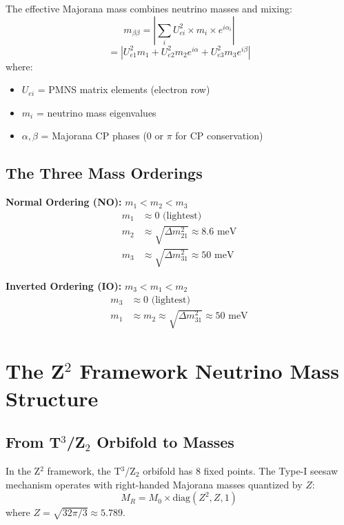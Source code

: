 \documentclass[12pt,a4paper]{article}
\begin{document}
The effective Majorana mass combines neutrino masses and mixing:
\begin{equation}
m_{\beta\beta} = \left| \sum_i U_{ei}^2 \times m_i \times e^{i\alpha_i} \right|
\end{equation}
\begin{equation}
= \left| U_{e1}^2 m_1 + U_{e2}^2 m_2 e^{i\alpha} + U_{e3}^2 m_3 e^{i\beta} \right|
\end{equation}
where:
\begin{itemize}
\item $U_{ei}$ = PMNS matrix elements (electron row)
\item $m_i$ = neutrino mass eigenvalues
\item $\alpha, \beta$ = Majorana CP phases (0 or $\pi$ for CP conservation)
\end{itemize}

\subsection{The Three Mass Orderings}

\textbf{Normal Ordering (NO):} $m_1 < m_2 < m_3$
\begin{align}
m_1 &\approx 0 \text{ (lightest)} \\
m_2 &\approx \sqrt{\Delta m^2_{21}} \approx 8.6 \text{ meV} \\
m_3 &\approx \sqrt{\Delta m^2_{31}} \approx 50 \text{ meV}
\end{align}

\textbf{Inverted Ordering (IO):} $m_3 < m_1 < m_2$
\begin{align}
m_3 &\approx 0 \text{ (lightest)} \\
m_1 &\approx m_2 \approx \sqrt{\Delta m^2_{31}} \approx 50 \text{ meV}
\end{align}

\section{The Z$^2$ Framework Neutrino Mass Structure}

\subsection{From T$^3$/Z$_2$ Orbifold to Masses}

In the Z$^2$ framework, the T$^3$/Z$_2$ orbifold has 8 fixed points. The Type-I seesaw mechanism operates with right-handed Majorana masses quantized by $Z$:
\begin{equation}
M_R = M_0 \times \text{diag}(Z^2, Z, 1)
\end{equation}
where $Z = \sqrt{32\pi/3} \approx 5.789$.
\end{document}
